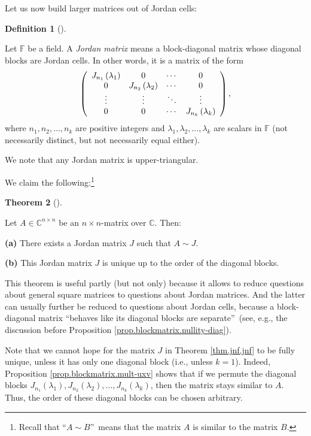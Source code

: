 \documentclass[numbers=enddot,12pt,final,onecolumn,notitlepage]{scrartcl}%
\numberwithin{exer}{subsection}
\theoremstyle{definition}
\newtheorem{theo}{Theorem}[subsection]
\newenvironment{theorem}[1][]
{\begin{theo}[#1]\begin{leftbar}}
{\end{leftbar}\end{theo}}
\newtheorem{defi}[theo]{Definition}
\newenvironment{definition}[1][]
{\begin{defi}[#1]\begin{leftbar}}
{\end{leftbar}\end{defi}}
\begin{document}
Let us now build larger matrices out of Jordan cells:

\begin{definition}
\label{def.jnf.jmat}Let $\mathbb{F}$ be a field. A \emph{Jordan matrix} means
a block-diagonal matrix whose diagonal blocks are Jordan cells. In other
words, it is a matrix of the form%
\[
\left(
\begin{array}
[c]{cccc}%
J_{n_{1}}\left(  \lambda_{1}\right)  & 0 & \cdots & 0\\
0 & J_{n_{2}}\left(  \lambda_{2}\right)  & \cdots & 0\\
\vdots & \vdots & \ddots & \vdots\\
0 & 0 & \cdots & J_{n_{k}}\left(  \lambda_{k}\right)
\end{array}
\right)  ,
\]
where $n_{1},n_{2},\ldots,n_{k}$ are positive integers and $\lambda
_{1},\lambda_{2},\ldots,\lambda_{k}$ are scalars in $\mathbb{F}$ (not
necessarily distinct, but not necessarily equal either).
\end{definition}

We note that any Jordan matrix is upper-triangular. \medskip

We claim the following:\footnote{Recall that \textquotedblleft$A\sim
B$\textquotedblright\ means that the matrix $A$ is similar to the matrix $B$.}

\begin{theorem}
[Jordan canonical form theorem]\label{thm.jnf.jnf}Let $A\in\mathbb{C}^{n\times
n}$ be an $n\times n$-matrix over $\mathbb{C}$. Then:

\textbf{(a)} There exists a Jordan matrix $J$ such that $A\sim J$.

\textbf{(b)} This Jordan matrix $J$ is unique up to the order of the diagonal blocks.
\end{theorem}

This theorem is useful partly (but not only) because it allows to reduce
questions about general square matrices to questions about Jordan matrices.
And the latter can usually further be reduced to questions about Jordan cells,
because a block-diagonal matrix \textquotedblleft behaves like its diagonal
blocks are separate\textquotedblright\ (see, e.g., the discussion before
Proposition \ref{prop.blockmatrix.nullity-diag}).

Note that we cannot hope for the matrix $J$ in Theorem \ref{thm.jnf.jnf} to be
fully unique, unless it has only one diagonal block (i.e., unless $k=1$).
Indeed, Proposition \ref{prop.blockmatrix.mult-uxv} shows that if we permute
the diagonal blocks $J_{n_{1}}\left(  \lambda_{1}\right)  ,J_{n_{2}}\left(
\lambda_{2}\right)  ,\ldots,J_{n_{k}}\left(  \lambda_{k}\right)  $, then the
matrix stays similar to $A$. Thus, the order of these diagonal blocks can be
chosen arbitrary.
\end{document}
